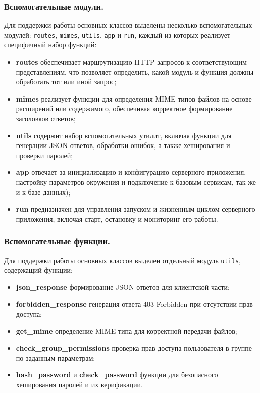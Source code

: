 \subsubsection{Вспомогательные модули.}
Для поддержки работы основных классов выделены несколько вспомогательных модулей: \texttt{routes}, \texttt{mimes}, \texttt{utils}, \texttt{app} и \texttt{run}, каждый из которых реализует специфичный набор функций:
\begin{itemize}
	\item \textbf{routes} обеспечивает маршрутизацию HTTP-запросов к соответствующим представлениям, что позволяет определить, какой модуль и функция должны обработать тот или иной запрос;
	\item \textbf{mimes} реализует функции для определения MIME-типов файлов на основе расширений или содержимого, обеспечивая корректное формирование заголовков ответов;
	\item \textbf{utils} содержит набор вспомогательных утилит, включая функции для генерации JSON-ответов, обработки ошибок, а также хеширования и проверки паролей;
	\item \textbf{app} отвечает за инициализацию и конфигурацию серверного приложения, настройку параметров окружения и подключение к базовым сервисам, так же и к базе данных);
	\item \textbf{run} предназначен для управления запуском и жизненным циклом серверного приложения, включая старт, остановку и мониторинг его работы.
\end{itemize}


\subsubsection{Вспомогательные функции.}
Для поддержки работы основных классов выделен отдельный модуль \texttt{utils}, содержащий функции:
\begin{itemize}
	\item \textbf{json\_response} формирование JSON-ответов для клиентской части;
	\item \textbf{forbidden\_response} генерация ответа 403 Forbidden при отсутствии прав доступа;
	\item \textbf{get\_mime} определение MIME-типа для корректной передачи файлов;
	\item \textbf{check\_group\_permissions} проверка прав доступа пользователя в группе по заданным параметрам;
	\item \textbf{hash\_password} и \textbf{check\_password} функции для безопасного хеширования паролей и их верификации.
\end{itemize}


